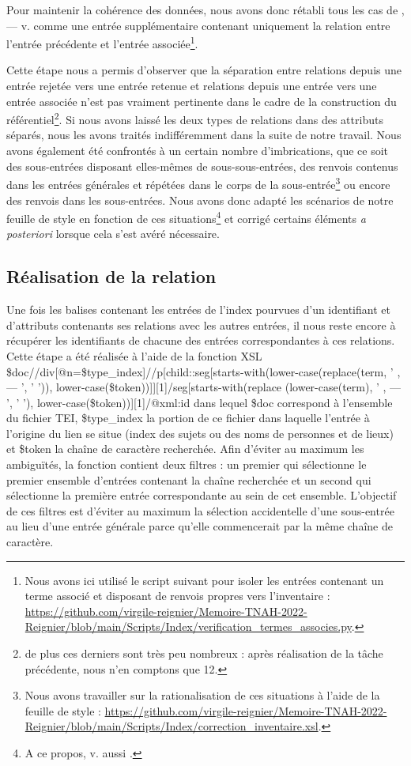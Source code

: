 \documentclass[a4paper,12pt,twoside]{book}
\begin{document}
	\noindent Pour maintenir la cohérence des données, nous avons donc rétabli tous les cas de \og{} , — v. \fg{} comme une entrée supplémentaire contenant uniquement la relation entre l'entrée précédente et l'entrée associée\footnote{Nous avons ici utilisé le script suivant pour isoler les entrées contenant un terme associé et disposant de renvois propres vers l'inventaire : \url{https://github.com/virgile-reignier/Memoire-TNAH-2022-Reignier/blob/main/Scripts/Index/verification_termes_associes.py}.}. 
	
	Cette étape nous a permis d'observer que la séparation entre relations depuis une entrée rejetée vers une entrée retenue et relations depuis une entrée vers une entrée associée n'est pas vraiment pertinente dans le cadre de la construction du référentiel\footnote{de plus ces derniers sont très peu nombreux : après réalisation de la tâche précédente, nous n'en comptons que 12.}. Si nous avons laissé les deux types de relations dans des attributs séparés, nous les avons traités indifféremment dans la suite de notre travail. Nous avons également été confrontés à un certain nombre d'imbrications, que ce soit des sous-entrées disposant elles-mêmes de sous-sous-entrées, des renvois contenus dans les entrées générales et répétées dans le corps de la sous-entrée\footnote{Nous avons travailler sur la rationalisation de ces situations à l'aide de la feuille de style : \url{https://github.com/virgile-reignier/Memoire-TNAH-2022-Reignier/blob/main/Scripts/Index/correction_inventaire.xsl}.} ou encore des renvois dans les sous-entrées. Nous avons donc adapté les scénarios de notre feuille de style en fonction de ces situations\footnote{A ce propos, v. aussi \cite{reignier_lindex_2022}.} et corrigé certains éléments \textit{a posteriori} lorsque cela s'est avéré nécessaire.
	
	\subsection{Réalisation de la relation}
	
	Une fois les balises contenant les entrées de l'index pourvues d'un identifiant et d'attributs contenants ses relations avec les autres entrées, il nous reste encore à récupérer les identifiants de chacune des entrées correspondantes à ces relations. Cette étape a été réalisée à l'aide de la fonction XSL \og \$doc//div[@n=\$type\_index]//p[child::seg[starts-with(lower-case(replace(term, ' , — ', ' ')), lower-case(\$token))]][1]/seg[starts-with(replace (lower-case(term), ' , — ', ' '), lower-case(\$token))][1]/@xml:id\fg{} dans lequel \$doc correspond à l'ensemble du fichier TEI, \$type\_index la portion de ce fichier dans laquelle l'entrée à l'origine du lien se situe (index des sujets ou des noms de personnes et de lieux) et \$token la chaîne de caractère recherchée. Afin d'éviter au maximum les ambiguïtés, la fonction contient deux filtres : un premier qui sélectionne le premier ensemble d'entrées contenant la chaîne recherchée et un second qui sélectionne la première entrée correspondante au sein de cet ensemble. L'objectif de ces filtres est d'éviter au maximum la sélection accidentelle d'une sous-entrée au lieu d'une entrée générale parce qu'elle commencerait par la même chaîne de caractère.
	
\end{document}
